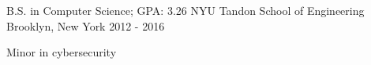 

\begin{cventries}

  \cventry
    {B.S. in Computer Science;  GPA: 3.26} %
    {NYU Tandon School of Engineering} %
    {Brooklyn, New York} %
    {2012 - 2016} %
    {
      \begin{cvitems} %
        \item {Minor in cybersecurity}
      \end{cvitems}
    }

\end{cventries}

